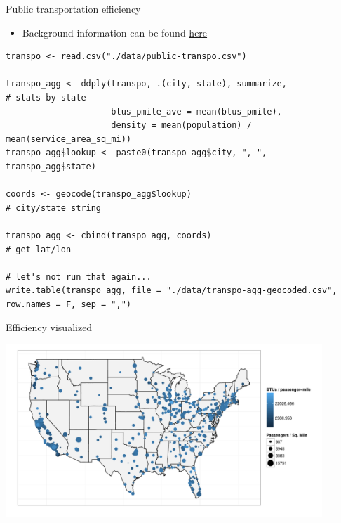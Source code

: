 \documentclass[sans,aspectratio=169,presentation,bigger,fleqn]{beamer}
\begin{document}
\begin{frame}[fragile,label=sec-28]{Public transportation efficiency}
 \begin{itemize}
\item Background information can be found \href{https://github.com/tcrug/public-transpo}{here}
\end{itemize}

\scriptsize

\begin{verbatim}
transpo <- read.csv("./data/public-transpo.csv")

transpo_agg <- ddply(transpo, .(city, state), summarize,                    # stats by state
                     btus_pmile_ave = mean(btus_pmile),
                     density = mean(population) / mean(service_area_sq_mi))
transpo_agg$lookup <- paste0(transpo_agg$city, ", ", transpo_agg$state)

coords <- geocode(transpo_agg$lookup)                                       # city/state string

transpo_agg <- cbind(transpo_agg, coords)                                   # get lat/lon

# let's not run that again...
write.table(transpo_agg, file = "./data/transpo-agg-geocoded.csv", row.names = F, sep = ",")
\end{verbatim}
\normalsize
\end{frame}
\begin{frame}[label=sec-29]{Efficiency visualized}
\begin{center}
\includegraphics[height=6.5cm]{./plots/transpo-plot.pdf}
\end{center}

\normalsize
\end{frame}
\end{document}
